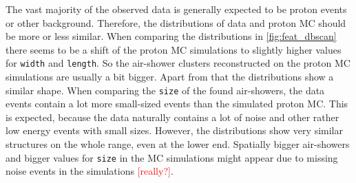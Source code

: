 The vast majority of the observed data is generally expected to be proton
events or other background. Therefore, the distributions of data and proton MC
should be more or less similar. When comparing the distributions in
\autoref{fig:feat_dbscan} there seems to be a shift of the proton MC
simulations to slightly higher values for \texttt{width} and \texttt{length}.
So the air-shower clusters reconstructed on the proton MC simulations are
usually a bit bigger. Apart from that the distributions show a similar shape.
When comparing the \texttt{size} of the found air-showers, the data events
contain a lot more small-sized events than the simulated proton MC. This is
expected, because the data naturally contains a lot of noise and other rather
low energy events with small sizes. However, the distributions show very
similar structures on the whole range, even at the lower end. Spatially bigger
air-showers and bigger values for \texttt{size} in the MC simulations might
appear due to missing noise events in the simulations \textcolor{red}{[really?]}.

